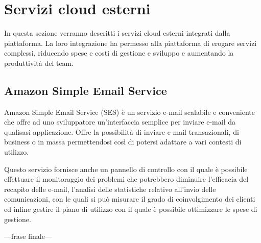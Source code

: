 \section{Servizi cloud esterni}
In questa sezione verranno descritti i servizi cloud esterni integrati dalla piattaforma.
La loro integrazione ha permesso alla piattaforma di erogare servizi complessi, riducendo spese e costi
di gestione e sviluppo e aumentando la produttività del team.

\subsection{Amazon Simple Email Service}
Amazon Simple Email Service \cite{AWS-SES} (SES) è un servizio e-mail scalabile e conveniente che
offre ad uno sviluppatore un'interfaccia semplice per inviare e-mail da qualisasi applicazione.
Offre la possibilità di inviare e-mail transazionali, di business o in massa permettendosi così
di potersi adattare a vari contesti di utilizzo.

Questo servizio fornisce anche un pannello di controllo con il quale è possibile effettuare il monitoraggio dei
problemi che potrebbero diminuire l'efficacia del recapito delle e-mail, l'analisi delle statistiche
relativo all'invio delle comunicazioni, con le quali si può misurare il grado di coinvolgimento dei clienti
ed infine gestire il piano di utilizzo con il quale è possibile ottimizzare le spese di gestione.

---frase finale---